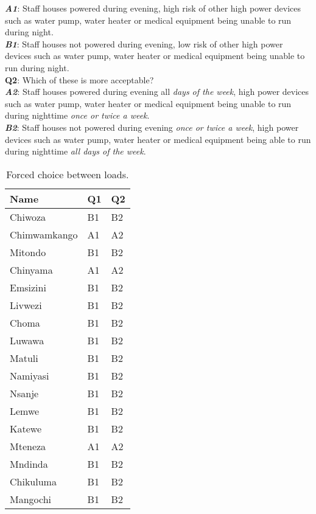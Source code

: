 \textbf{\textit{A1}}: Staff houses powered during evening, high risk of other high power devices such as water pump, water heater or medical equipment being unable to run during night.\\

\textbf{\textit{B1}}: Staff houses not powered during evening, low risk of other high power devices such as water pump, water heater or medical equipment being unable to run during night.\\

\noindent\textbf{Q2}: Which of these is more acceptable?\\

\textbf{\textit{A2}}: Staff houses powered during evening all \textit{days of the week},  high power devices such as water pump, water heater or medical equipment being unable to run during nighttime \textit{once or twice a week}.\\

\textbf{\textit{B2}}: Staff houses not powered during evening \textit{once or twice a week},  high power devices such as water pump, water heater or medical equipment being able to run during nighttime \textit{all days of the week}.


\begin{table}[ht!]
\centering
    \begin{tabular}{ m{4cm} m{2.5cm} m{2.5cm}} 
    \toprule
    \toprule
    \textbf{Name} & \textbf{Q1} & \textbf{Q2}\\
    \midrule
    Chiwoza         & B1 & B2  \\
    Chimwamkango    & A1 & A2  \\
    Mitondo         & B1 & B2  \\
    Chinyama        & A1 & A2  \\
    Emsizini        & B1 & B2  \\
    Livwezi         & B1 & B2  \\
    Choma           & B1 & B2  \\
    Luwawa          & B1 & B2  \\
    Matuli          & B1 & B2  \\
    Namiyasi        & B1 & B2  \\
    Nsanje          & B1 & B2  \\
    Lemwe           & B1 & B2  \\
    Katewe          & B1 & B2  \\
    Mteneza         & A1 & A2  \\
    Mndinda         & B1 & B2  \\
    Chikuluma       & B1 & B2  \\
    Mangochi        & B1 & B2  \\
    
    \bottomrule
    \bottomrule
    \end{tabular}
\caption[User survey- Forced choice]{Forced choice between loads.}
\end{table}

